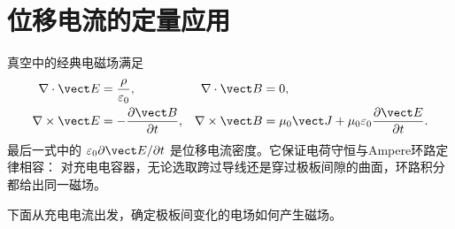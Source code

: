 \section{位移电流的定量应用}

真空中的经典电磁场满足
\begin{align}
 \nabla\cdot\vect E&=\frac{\rho}{\varepsilon_0},&
 \nabla\cdot\vect B&=0,\\
 \nabla\times\vect E&=-\frac{\partial\vect B}{\partial t},&
 \nabla\times\vect B&=\mu_0\vect J+\mu_0\varepsilon_0
 \frac{\partial\vect E}{\partial t}.
\end{align}
最后一式中的 $\varepsilon_0\partial\vect E/\partial t$ 是位移电流密度。它保证电荷守恒与Ampere环路定律相容：
对充电电容器，无论选取跨过导线还是穿过极板间隙的曲面，环路积分都给出同一磁场。


下面从充电电流出发，确定极板间变化的电场如何产生磁场。

